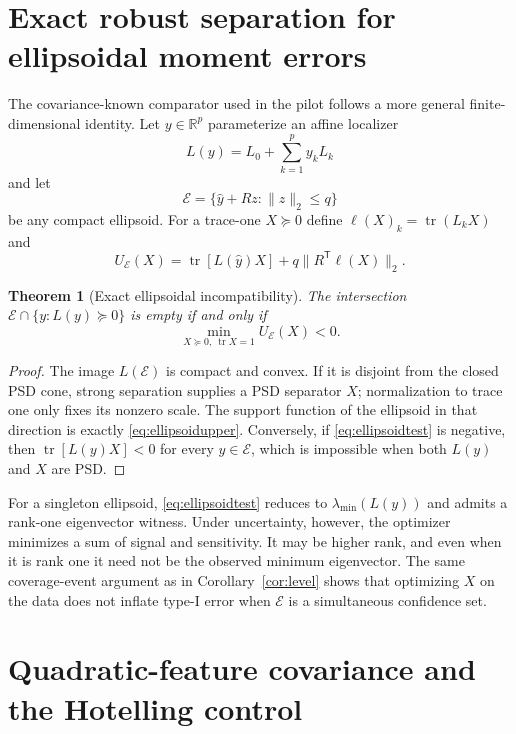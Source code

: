 \documentclass[11pt]{article}
\newtheorem{theorem}{Theorem}
\newcommand{\tr}{\operatorname{tr}}
\begin{document}
\section{Exact robust separation for ellipsoidal moment errors}
\label{app:ellipsoid}

The covariance-known comparator used in the pilot follows a more general
finite-dimensional identity.  Let $y\in\mathbb R^p$ parameterize an affine
localizer
\[
 L(y)=L_0+\sum_{k=1}^p y_kL_k
\]
and let
\[
 \mathcal E=\{\widehat y+Rz:\|z\|_2\le q\}
\]
be any compact ellipsoid.  For a trace-one $X\succeq0$ define
$\ell(X)_k=\tr(L_kX)$ and
\begin{equation}
 U_{\mathcal E}(X)=\tr[L(\widehat y)X]
       +q\|R^{\mathsf T}\ell(X)\|_2.
 \label{eq:ellipsoidupper}
\end{equation}

\begin{theorem}[Exact ellipsoidal incompatibility]
\label{thm:ellipsoid}
The intersection $\mathcal E\cap\{y:L(y)\succeq0\}$ is empty if and only if
\begin{equation}
 \min_{X\succeq0,\ \tr X=1}U_{\mathcal E}(X)<0.
 \label{eq:ellipsoidtest}
\end{equation}
\end{theorem}

\begin{proof}
The image $L(\mathcal E)$ is compact and convex.  If it is disjoint from the
closed PSD cone, strong separation supplies a PSD separator $X$; normalization
to trace one only fixes its nonzero scale.  The support function of the
ellipsoid in that direction is exactly \eqref{eq:ellipsoidupper}.  Conversely,
if \eqref{eq:ellipsoidtest} is negative, then
$\tr[L(y)X]<0$ for every $y\in\mathcal E$, which is impossible when both
$L(y)$ and $X$ are PSD.
\end{proof}

For a singleton ellipsoid, \eqref{eq:ellipsoidtest} reduces to
$\lambda_{\min}(L(y))$ and admits a rank-one eigenvector witness.  Under
uncertainty, however, the optimizer minimizes a sum of signal and sensitivity.
It may be higher rank, and even when it is rank one it need not be the observed
minimum eigenvector.  The same coverage-event argument as in
Corollary~\ref{cor:level} shows that optimizing $X$ on the data does not inflate
type-I error when $\mathcal E$ is a simultaneous confidence set.

\section{Quadratic-feature covariance and the Hotelling control}
\label{app:isserlis}
\end{document}
